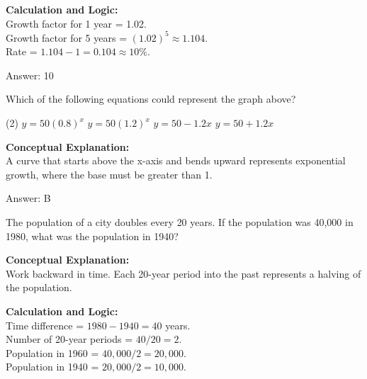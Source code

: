 \documentclass[11pt,paper=a4,answers]{exam}
\begin{document}
\begin{questions}
\begin{solution}
\textbf{Calculation and Logic:} \\
Growth factor for 1 year = 1.02. \\
Growth factor for 5 years = $(1.02)^5 \approx 1.104$. \\
Rate = $1.104 - 1 = 0.104 \approx 10\%$.

\vspace{25pt}

Answer: \colorbox{yellow!100}{10}
\end{solution}

\vspace{40pt}

\question

Which of the following equations could represent the graph above?
\begin{tasks}(2)
    \task $y = 50(0.8)^x$
    \task $y = 50(1.2)^x$
    \task $y = 50 - 1.2x$
    \task $y = 50 + 1.2x$
\end{tasks}

\begin{solution}
\textbf{Conceptual Explanation:} \\
A curve that starts above the x-axis and bends upward represents exponential growth, where the base must be greater than 1.

\vspace{25pt}

Answer: \colorbox{yellow!100}{B}
\end{solution}

\vspace{40pt}

\question
The population of a city doubles every 20 years. If the population was 40,000 in 1980, what was the population in 1940?

\begin{solution}
\textbf{Conceptual Explanation:} \\
Work backward in time. Each 20-year period into the past represents a halving of the population.

\vspace{20pt}

\textbf{Calculation and Logic:} \\
Time difference = $1980 - 1940 = 40$ years. \\
Number of 20-year periods = $40 / 20 = 2$. \\
Population in 1960 = $40,000 / 2 = 20,000$. \\
Population in 1940 = $20,000 / 2 = 10,000$.


\end{solution}
\end{questions}
\end{document}
